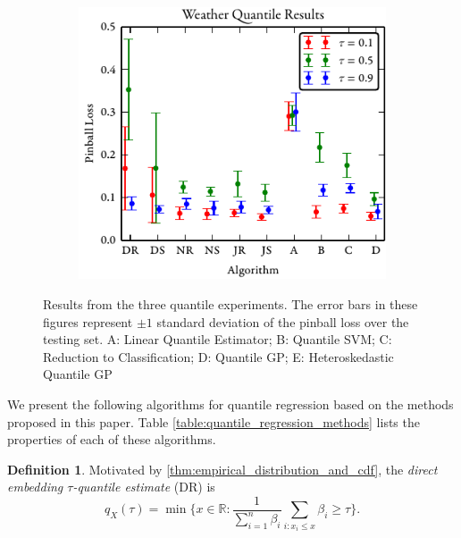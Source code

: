 \documentclass[twoside]{article} \usepackage{aistats2017}
\theoremstyle{definition}
\newtheorem{definition}{Definition}[section]
\theoremstyle{theorem}
\newcommand{\rv}[1]{{#1}}
\begin{document}
\begin{figure}[t]
		\begin{subfigure}[b]{0.32\textwidth}
			\includegraphics[width=\textwidth]{figures/Weather_results}
		\end{subfigure}
		\caption{Results from the three quantile experiments. The error bars in these figures represent $\pm 1$ standard deviation of the pinball loss over the testing set. A: Linear Quantile Estimator; B: Quantile SVM; C: Reduction to Classification; D: Quantile GP; E: Heteroskedastic Quantile GP}
		\label{fig:qfull}
	\end{figure}
	We present the following algorithms for quantile regression based on the methods proposed in this paper. Table \ref{table:quantile_regression_methods} lists the properties of each of these algorithms.

	\theoremstyle{definition}
	\begin{definition}
		Motivated by \cref{thm:empirical_distribution_and_cdf}, the \textit{direct embedding $\tau$-quantile estimate} (DR) is
		\begin{equation}
		q_{\rv{X}}(\tau) = \min\{x \in \mathbb{R} : \frac{1}{\sum_{i = 1}^{n} \beta_{i}} \sum_{i : x_{i} \leq x} \beta_{i} \geq \tau\}.
		\end{equation}	
	\end{definition}
	
\end{document}
